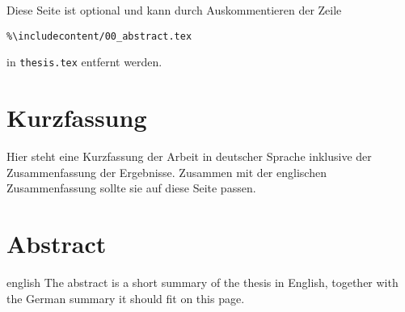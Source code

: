 \thispagestyle{plain}

Diese Seite ist optional und kann durch Auskommentieren der Zeile
\begin{center}
    \texttt{\%\textbackslash include\textbraceleft content/00\_abstract.tex\textbraceright}
\end{center}
in \texttt{thesis.tex} entfernt werden.

\section*{Kurzfassung}
Hier steht eine Kurzfassung der Arbeit in deutscher Sprache inklusive der Zusammenfassung der
Ergebnisse. 
Zusammen mit der englischen Zusammenfassung sollte sie auf diese Seite passen.

\section*{Abstract}
\begin{foreignlanguage}{english}
The abstract is a short summary of the thesis in English, together with the German summary it should fit on this page.
\end{foreignlanguage}
